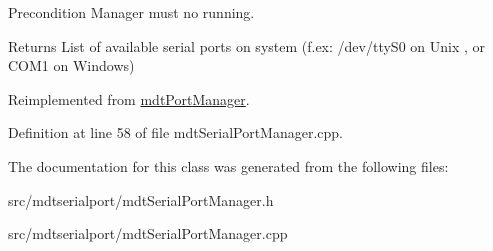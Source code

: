 \begin{DoxyPrecond}{Precondition}
Manager must no running. 
\end{DoxyPrecond}
\begin{DoxyReturn}{Returns}
List of available serial ports on system (f.ex: /dev/ttyS0 on Unix , or COM1 on Windows) 
\end{DoxyReturn}


Reimplemented from \hyperlink{classmdt_port_manager_aceb9b570a2ebf354e347b8d9b46f6927}{mdtPortManager}.



Definition at line 58 of file mdtSerialPortManager.cpp.



The documentation for this class was generated from the following files:\begin{DoxyCompactItemize}
\item 
src/mdtserialport/mdtSerialPortManager.h\item 
src/mdtserialport/mdtSerialPortManager.cpp\end{DoxyCompactItemize}
